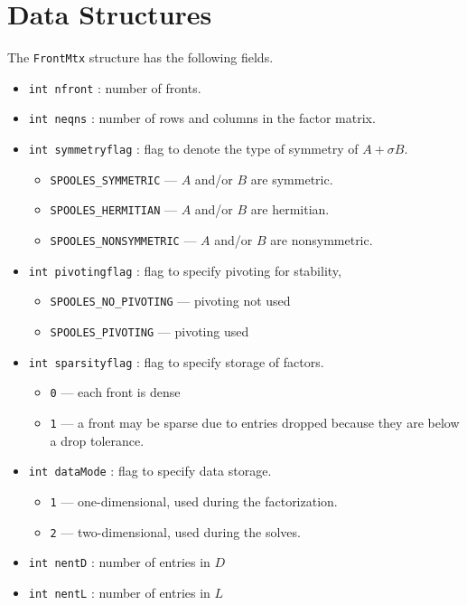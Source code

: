 \par
\section{Data Structures}
\label{section:FrontMtx:dataStructure}
\par
The {\tt FrontMtx} structure has the following fields.
\begin{itemize}
\item
{\tt int nfront} : number of fronts.
\item
{\tt int neqns} : number of rows and columns in the factor matrix.
\item
{\tt int symmetryflag} : flag to denote the type of symmetry
of $A + \sigma B$.
\begin{itemize}
\item
{\tt SPOOLES\_SYMMETRIC} --- $A$ and/or $B$ are symmetric.
\item
{\tt SPOOLES\_HERMITIAN} --- $A$ and/or $B$ are hermitian.
\item
{\tt SPOOLES\_NONSYMMETRIC} --- $A$ and/or $B$ are nonsymmetric.
\end{itemize}
\item
{\tt int pivotingflag} : flag to specify pivoting for stability,
\begin{itemize}
\item
{\tt SPOOLES\_NO\_PIVOTING} --- pivoting not used
\item
{\tt SPOOLES\_PIVOTING} --- pivoting used
\end{itemize}
\item
{\tt int sparsityflag} : flag to specify storage of factors.
\begin{itemize}
\item
{\tt 0} --- each front is dense
\item
{\tt 1} --- a front may be sparse due to entries dropped
because they are below a drop tolerance.
\end{itemize}
\item
{\tt int dataMode} : flag to specify data storage.
\begin{itemize}
\item
{\tt 1} --- one-dimensional, used during the factorization.
\item
{\tt 2} --- two-dimensional, used during the solves.
\end{itemize}
\item
{\tt int nentD} : number of entries in $D$
\item
{\tt int nentL} : number of entries in $L$

\end{itemize}
